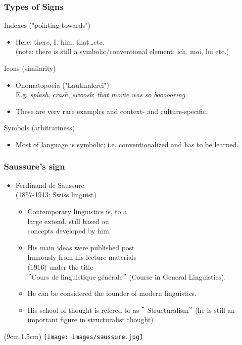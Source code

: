 \documentclass[12pt, table]{beamer}
\begin{document}
\begin{frame}
\frametitle{Types of Signs}
Indexes ("pointing towards")
\begin{itemize}
\item Here, there, I, him, that\dots etc.\\
(note: there is still a symbolic/conventional element: ich, moi, lui etc.)
\end{itemize}
Icons (similarity)
\begin{itemize}
\item Onomatopoeia ("Lautmalerei")\\
E.g. \textit{splash}, \textit{crash}, \textit{swoosh}; \textit{that movie was so boooooring}.
\item These are very rare examples and context- and culture-specific.
\end{itemize}
Symbols (arbitrariness)
\begin{itemize}
\item Most of language is symbolic; i.e. conventionalized and has to be learned.
\end{itemize}
\end{frame}

\begin{frame}
\frametitle{Saussure's sign}
\begin{itemize} 
\item Ferdinand de Saussure \\ (1857-1913; Swiss linguist)
\begin{itemize}
\item Contemporary linguistics is, to a \\ large extend, still based on \\ concepts developed by him.
\item His main ideas were published post \\ humously from his lecture materials \\ (1916) under the title \\ $"$Cours de linguistique g{\'e}n{\'e}rale$"$ (Course in General Linguistics).
\item He can be considered the founder of modern linguistics.
\item His school of thought is refered to as $"$ Structuralism$"$ (he is still an important figure in structuralist thought)
\end{itemize}
\end{itemize}
\begin{textblock*}{8cm}(9cm,1.5cm)
\texttt{[image: images/saussure.jpg]}
\end{textblock*}
\end{frame}
\end{document}
